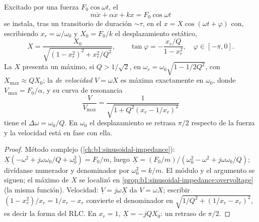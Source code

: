 \begin{theorem}\label{thm:b1:oscillators-resonance:forced}
Excitado por una fuerza $F_0\cos\omega t$, el 
\[
m\ddot x + \alpha\dot x + kx = F_0\cos\omega t
\]
se instala, tras un transitorio de duración $\sim\tau$, en el  $x = X\cos(\omega t + \varphi)$ con, escribiendo $x_r = \omega/\omega_0$
y $X_0 = F_0/k$ el desplazamiento estático,
\[
X = \frac{X_0}{\sqrt{(1 - x_r^2)^2 + x_r^2/Q^2}}, \qquad
\tan\varphi = -\frac{x_r/Q}{1 - x_r^2}, \quad \varphi \in [-\pi, 0] .
\]
La \emph{} $X$ presenta un máximo, si $Q > 1/\sqrt2$, en $\omega_r =
\omega_0\sqrt{1 - 1/2Q^2}$, con $X_{\max} \approx QX_0$; la \emph{
de velocidad} $V = \omega X$ es máxima exactamente en $\omega_0$, donde $V_{\max} =
F_0/\alpha$, y su curva de resonancia
\[
\frac{V}{V_{\max}} = \frac{1}{\sqrt{1 + Q^2(x_r - 1/x_r)^2}}
\]
tiene el  $\Delta\omega = \omega_0/Q$. En $\omega_0$ el
desplazamiento se retrasa $\pi/2$ respecto de la fuerza y la velocidad
está en fase con ella.
\end{theorem}

\begin{proof}
Método complejo (\cref{ch:b1:sinusoidal-impedance}): $\underline X(-\omega^2
+ j\omega\omega_0/Q + \omega_0^2) = F_0/m$, luego $\underline X = (F_0/m)/(\omega_0^2
- \omega^2 + j\omega\omega_0/Q)$; divídanse numerador y denominador por
$\omega_0^2 = k/m$. El módulo y el argumento se siguen; el máximo de $X$ se
localizó en \cref{prop:b1:sinusoidal-impedance:overvoltage} (la misma
función). Velocidad: $\underline V = j\omega\underline X$ da $V = \omega X$;
escribir $(1 - x_r^2)/x_r = 1/x_r - x_r$ convierte el denominador en
$\sqrt{1/Q^2 + (1/x_r - x_r)^2}$, es decir la forma del RLC. En $x_r = 1$,
$\underline X = -jQX_0$: un retraso de $\pi/2$.
\end{proof}

